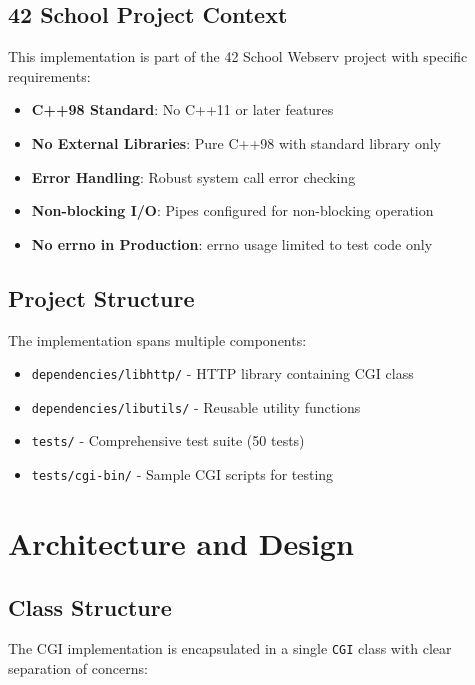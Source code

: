 \documentclass[11pt,a4paper]{article}
\begin{document}
\subsection{42 School Project Context}

This implementation is part of the 42 School Webserv project with specific requirements:

\begin{itemize}
    \item \textbf{C++98 Standard}: No C++11 or later features
    \item \textbf{No External Libraries}: Pure C++98 with standard library only
    \item \textbf{Error Handling}: Robust system call error checking
    \item \textbf{Non-blocking I/O}: Pipes configured for non-blocking operation
    \item \textbf{No errno in Production}: errno usage limited to test code only
\end{itemize}

\subsection{Project Structure}

The implementation spans multiple components:

\begin{itemize}
    \item \texttt{dependencies/libhttp/} - HTTP library containing CGI class
    \item \texttt{dependencies/libutils/} - Reusable utility functions
    \item \texttt{tests/} - Comprehensive test suite (50 tests)
    \item \texttt{tests/cgi-bin/} - Sample CGI scripts for testing
\end{itemize}

\newpage
\section{Architecture and Design}

\subsection{Class Structure}

The CGI implementation is encapsulated in a single \texttt{CGI} class with clear separation of concerns:
\end{document}

